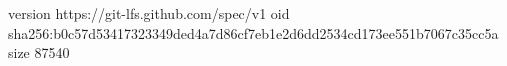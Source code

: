 version https://git-lfs.github.com/spec/v1
oid sha256:b0c57d53417323349ded4a7d86cf7eb1e2d6dd2534cd173ee551b7067c35cc5a
size 87540
